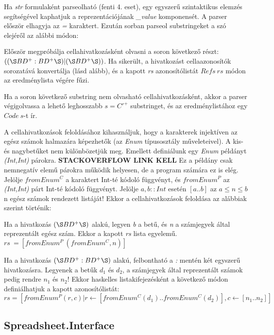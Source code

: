 Ha \textit{str} formulaként parseolható (fenti 4. eset), egy egyszerű szintaktikus elemzés segítségével kaphatjuk a reprezentációjának \textit{\_value} komponensét. A parser először elhagyja az \textit{=} karaktert. Ezután sorban parseol substringeket a szó elejéről az alábbi módon:
\begin{compactenum}
	\item Először megpróbálja cellahivatkozásként olvasni a soron következő részt: $((\S  BD^+:BD^+\S )|(\S BD^+\S ))$. Ha sikerült, a hivatkozást cellaazonosítók sorozatává konvertálja (lásd alább), és a kapott \textit{rs} azonosítólistát $Refs\ rs$ módon az eredménylista végére fűzi.
	\item Ha a soron következő substring nem olvasható cellahivatkozásként, akkor a parser végigolvassa a lehető leghosszabb $s = C'^+$ substringet, és az eredménylistához egy $Code\ s$-t ír.
\end{compactenum}

A cellahivatkozások feloldásához kihasználjuk, hogy a karakterek injektíven az egész számok halmazára képezhetők (az \textit{Enum} típusosztály műveleteivel). A kis- és nagybetűket nem különbözetjük meg. Emellett definiálunk egy \textit{Enum} példányt \textit{(Int,Int)} párokra. \textbf{STACKOVERFLOW LINK KELL} Ez a példány csak nemnegatív elemű párokra működik helyesen, de a program számára ez is elég. Jelölje $fromEnum^C$ a karaktert Int-té kódoló függvényt, és $fromEnum^P$ az \textit{(Int,Int)} párt Int-té kódoló függvényt. Jelölje $a,b :: Int$ esetén $[a..b]$ az $a \le n \le b$ n egész számok rendezett listáját! Ekkor a cellahivatkozások feloldása az alábbiak szerint történik:
\begin{compactenum}
	\item Ha a hivatkozás $(\S BD^+\S )$ alakú, legyen \textit{b} a betű, és \textit{n} a számjegyek által reprezentált egész szám. Ekkor a kapott  \textit{rs} lista egyelemű. $rs\ = [fromEnum^P\ (fromEnum^C,n)]$
	\item Ha a hivatkozás $(\S  BD^+:BD^+\S )$ alakú, felbontható a \textit{:} mentén két egyszerű hivatkozásra. Legyenek a betűk $d_1$ és $d_2$, a számjegyek által reprezentált számok pedig rendre $n_1$ és $n_2$! Ekkor haskelles listakifejezésként a következő módon definiálhatjuk a kapott azonosítólistát:	\mbox{$rs = [fromEnum^P (r,c) | r \leftarrow [fromEnum^C(d_1)..fromEnum^C(d_2)], c \leftarrow [n_1..n_2]]$}

\end{compactenum}

\subsection{Spreadsheet.Interface}

